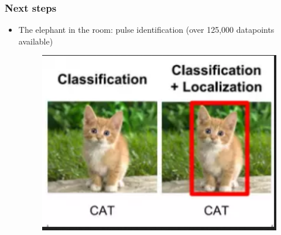\documentclass{beamer}
\begin{document}
\begin{frame}
	\frametitle{Next steps}

	\begin{itemize}
		
		\item The elephant in the room: pulse identification (over 125,000 datapoints available) 
		\begin{figure}
			\centering
			\includegraphics[scale=0.6]{fig19.png}
		\end{figure}

	\end{itemize}

\end{frame}
\end{document}
